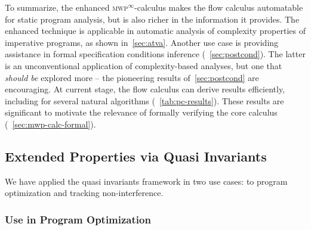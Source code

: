 To summarize, the enhanced \textsc{mwp}\(^\infty\)-calculus makes the flow calculus automatable for static program analysis,
but is also richer in the information it provides.
The enhanced technique is applicable in automatic analysis of complexity properties of imperative programs, as shown in~\autoref{sec:atva}.
Another use case is providing assistance in formal specification conditions inference (\cf~\autoref{sec:postcond}).
The latter is an unconventional application of complexity-based analyses, but one that \emph{should be} explored more --
the pioneering results of~\autoref{sec:postcond} are encouraging.
At current stage, the flow calculus can derive results efficiently, including for several natural algorithms (\cf~\autoref{tab:pc-results}).
These results are significant to motivate the relevance of formally verifying the core calculus (\cf~\autoref{sec:mwp-calc-formal}).


\subsection{Extended Properties via Quasi Invariants}
\label{subsec:res-qi}

We have applied the quasi invariants framework in two use cases: to program optimization and tracking non-interference.

\subsubsection{Use in Program Optimization}
\label{subsubsec:qi-opt}


